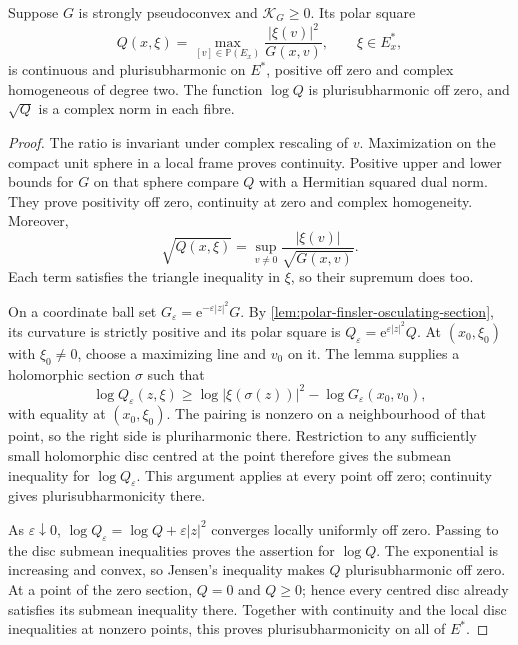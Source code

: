 \begin{proposition}\label{prop:semipositive-finsler-polar-psh}
Suppose $G$ is strongly pseudoconvex and $\mathcal K_G\geq0$. Its polar square
\[
 Q(x,\xi)=\max_{[v]\in\mathbb P(E_x)}
                \frac{|\xi(v)|^2}{G(x,v)},\qquad \xi\in E_x^*,
\]
is continuous and plurisubharmonic on $E^*$, positive off zero and complex homogeneous of degree two. The function $\log Q$ is plurisubharmonic off zero, and $\sqrt Q$ is a complex norm in each fibre.
\end{proposition}
\begin{proof}
The ratio is invariant under complex rescaling of $v$. Maximization on the compact unit sphere in a local frame proves continuity. Positive upper and lower bounds for $G$ on that sphere compare $Q$ with a Hermitian squared dual norm. They prove positivity off zero, continuity at zero and complex homogeneity. Moreover,
\[
 \sqrt{Q(x,\xi)}=\sup_{v\ne0}\frac{|\xi(v)|}{\sqrt{G(x,v)}}.
\]
Each term satisfies the triangle inequality in $\xi$, so their supremum does too.

On a coordinate ball set $G_\varepsilon=\mathrm e^{-\varepsilon|z|^2}G$. By \cref{lem:polar-finsler-osculating-section}, its curvature is strictly positive and its polar square is $Q_\varepsilon=\mathrm e^{\varepsilon|z|^2}Q$. At $(x_0,\xi_0)$ with $\xi_0\ne0$, choose a maximizing line and $v_0$ on it. The lemma supplies a holomorphic section $\sigma$ such that
\[
 \log Q_\varepsilon(z,\xi)
 \geq\log|\xi(\sigma(z))|^2-\log G_\varepsilon(x_0,v_0),
\]
with equality at $(x_0,\xi_0)$. The pairing is nonzero on a neighbourhood of that point, so the right side is pluriharmonic there. Restriction to any sufficiently small holomorphic disc centred at the point therefore gives the submean inequality for $\log Q_\varepsilon$. This argument applies at every point off zero; continuity gives plurisubharmonicity there.

As $\varepsilon\downarrow0$, $\log Q_\varepsilon=\log Q+\varepsilon|z|^2$ converges locally uniformly off zero. Passing to the disc submean inequalities proves the assertion for $\log Q$. The exponential is increasing and convex, so Jensen's inequality makes $Q$ plurisubharmonic off zero. At a point of the zero section, $Q=0$ and $Q\geq0$; hence every centred disc already satisfies its submean inequality there. Together with continuity and the local disc inequalities at nonzero points, this proves plurisubharmonicity on all of $E^*$.
\end{proof}

